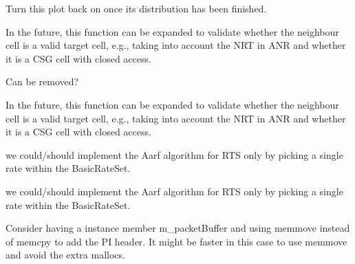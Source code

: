 \begin{DoxyRefList}
Turn this plot back on once its distribution has been finished.  
\item[\label{todo__todo000071}%
\hypertarget{todo__todo000071}{}%
Member \hyperlink{classns3_1_1A2A4RsrqHandoverAlgorithm_a6d9106afebe16783ac637e9672a2fae1}{ns3\+:\+:A2\+A4\+Rsrq\+Handover\+Algorithm\+:\+:Is\+Valid\+Neighbour} (uint16\+\_\+t cell\+Id)]In the future, this function can be expanded to validate whether the neighbour cell is a valid target cell, e.\+g., taking into account the N\+RT in A\+NR and whether it is a C\+SG cell with closed access.  
\item[\label{todo__todo000072}%
\hypertarget{todo__todo000072}{}%
Member \hyperlink{classns3_1_1A2A4RsrqHandoverAlgorithm_1_1UeMeasure_a911751668a98f3e5254d60eef5beec7f}{ns3\+:\+:A2\+A4\+Rsrq\+Handover\+Algorithm\+:\+:Ue\+Measure\+:\+:m\+\_\+rsrp} ]Can be removed?  
\item[\label{todo__todo000073}%
\hypertarget{todo__todo000073}{}%
Member \hyperlink{classns3_1_1A3RsrpHandoverAlgorithm_a09211bfb353fb6ef9df7b379a0a63fd3}{ns3\+:\+:A3\+Rsrp\+Handover\+Algorithm\+:\+:Is\+Valid\+Neighbour} (uint16\+\_\+t cell\+Id)]In the future, this function can be expanded to validate whether the neighbour cell is a valid target cell, e.\+g., taking into account the N\+RT in A\+NR and whether it is a C\+SG cell with closed access.  
\item[\label{todo__todo000167}%
\hypertarget{todo__todo000167}{}%
Member \hyperlink{classns3_1_1AarfcdWifiManager_a4c4e397e54ae8ff36a90a1e044825586}{ns3\+:\+:Aarfcd\+Wifi\+Manager\+:\+:Do\+Get\+Rts\+Tx\+Vector} (\hyperlink{structns3_1_1WifiRemoteStation}{Wifi\+Remote\+Station} $\ast$station)]we could/should implement the Aarf algorithm for R\+TS only by picking a single rate within the Basic\+Rate\+Set.  
\item[\label{todo__todo000166}%
\hypertarget{todo__todo000166}{}%
Member \hyperlink{classns3_1_1AarfWifiManager_a4c2d4fbb34d152c3c4fe4530681da512}{ns3\+:\+:Aarf\+Wifi\+Manager\+:\+:Do\+Get\+Rts\+Tx\+Vector} (\hyperlink{structns3_1_1WifiRemoteStation}{Wifi\+Remote\+Station} $\ast$station)]we could/should implement the Aarf algorithm for R\+TS only by picking a single rate within the Basic\+Rate\+Set.  
\item[\label{todo__todo000031}%
\hypertarget{todo__todo000031}{}%
Member \hyperlink{group__fd-net-device_gad3e41a1d562aec7c106c65c5964071b6}{ns3\+:\+:Add\+P\+I\+Header} (uint8\+\_\+t $\ast$\&buf, size\+\_\+t \&len)]Consider having a instance member m\+\_\+packet\+Buffer and using memmove instead of memcpy to add the PI header. It might be faster in this case to use memmove and avoid the extra mallocs.  

\end{DoxyRefList}
